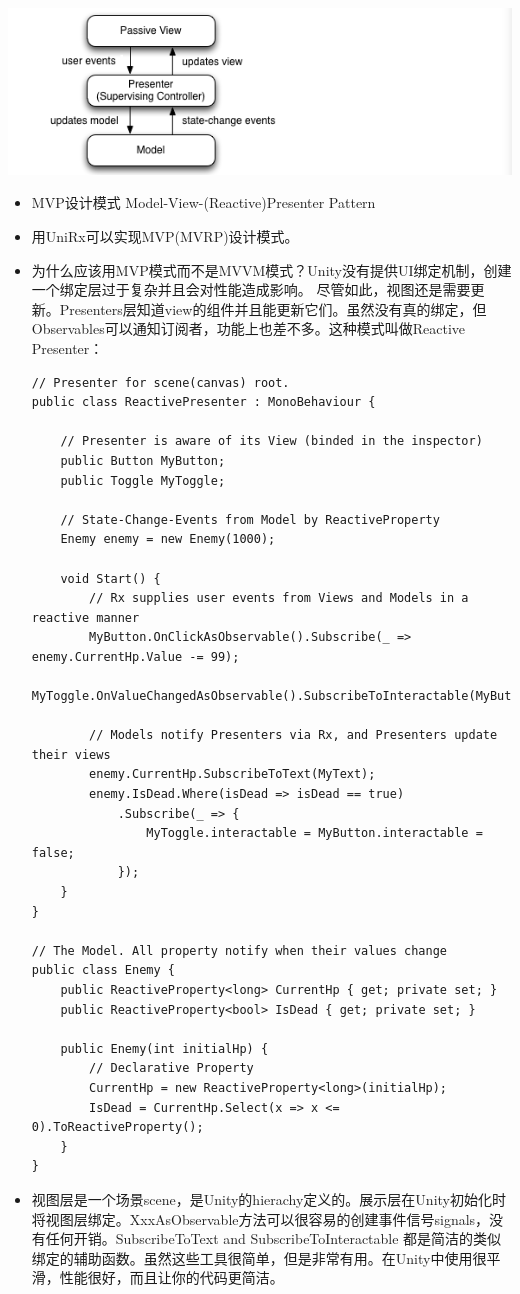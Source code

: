 \documentclass[9pt, b5paper]{article}
\begin{document}
\includegraphics[width=.9\linewidth]{./pic/readme_20221012_085735.png}
\begin{itemize}
\item MVP设计模式 Model-View-(Reactive)Presenter Pattern
\item 用UniRx可以实现MVP(MVRP)设计模式。
\item 为什么应该用MVP模式而不是MVVM模式？Unity没有提供UI绑定机制，创建一个绑定层过于复杂并且会对性能造成影响。 尽管如此，视图还是需要更新。Presenters层知道view的组件并且能更新它们。虽然没有真的绑定，但Observables可以通知订阅者，功能上也差不多。这种模式叫做Reactive Presenter：
\begin{verbatim}
// Presenter for scene(canvas) root.
public class ReactivePresenter : MonoBehaviour {

    // Presenter is aware of its View (binded in the inspector)
    public Button MyButton;
    public Toggle MyToggle;
    
    // State-Change-Events from Model by ReactiveProperty
    Enemy enemy = new Enemy(1000);

    void Start() {
        // Rx supplies user events from Views and Models in a reactive manner 
        MyButton.OnClickAsObservable().Subscribe(_ => enemy.CurrentHp.Value -= 99);
        MyToggle.OnValueChangedAsObservable().SubscribeToInteractable(MyButton);

        // Models notify Presenters via Rx, and Presenters update their views
        enemy.CurrentHp.SubscribeToText(MyText);
        enemy.IsDead.Where(isDead => isDead == true)
            .Subscribe(_ => {
                MyToggle.interactable = MyButton.interactable = false;
            });
    }
}

// The Model. All property notify when their values change
public class Enemy {
    public ReactiveProperty<long> CurrentHp { get; private set; }
    public ReactiveProperty<bool> IsDead { get; private set; }

    public Enemy(int initialHp) {
        // Declarative Property
        CurrentHp = new ReactiveProperty<long>(initialHp);
        IsDead = CurrentHp.Select(x => x <= 0).ToReactiveProperty();
    }
}
\end{verbatim}
\item 视图层是一个场景scene，是Unity的hierachy定义的。展示层在Unity初始化时将视图层绑定。XxxAsObservable方法可以很容易的创建事件信号signals，没有任何开销。SubscribeToText and SubscribeToInteractable 都是简洁的类似绑定的辅助函数。虽然这些工具很简单，但是非常有用。在Unity中使用很平滑，性能很好，而且让你的代码更简洁。
\end{itemize}
\end{document}
